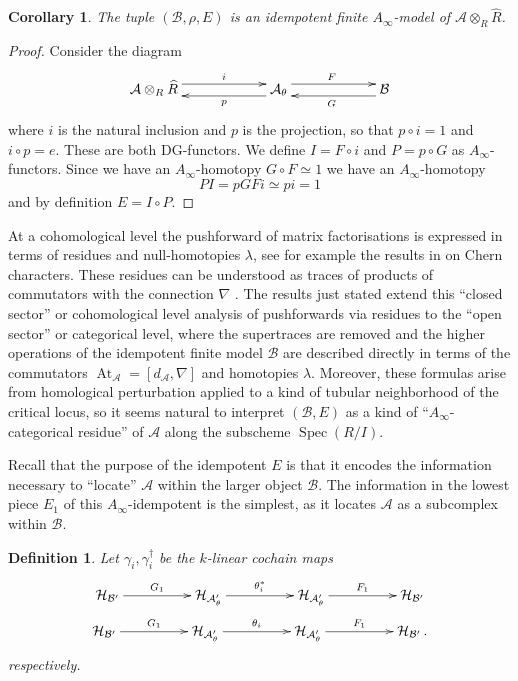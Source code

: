 \documentclass[english,letter paper,12pt,leqno]{article}
\newtheorem{corollary}[theorem]{Corollary}
\theoremstyle{example}
\newtheorem{definition}[theorem]{Definition}
\numberwithin{equation}{section}
\def\AA{\mathcal{A}}
\def\BB{\mathcal{B}}
\def\HH{\HH}
\def\HH{\mathcal{H}}
\DeclareMathOperator{\Spec}{Spec}
\DeclareMathOperator{\vAt}{At}
\begin{document}
\begin{corollary}\label{corollary:idempotent_finite_model} The tuple $(\BB, \rho, E)$ is an idempotent finite $A_\infty$-model of $\AA \otimes_R \widehat{R}$.
\end{corollary}
\begin{proof}
Consider the diagram
\[
\xymatrix@C+3pc{
\AA \otimes_R \widehat{R} \ar@<1ex>[r]^-{i} & \AA_\theta \ar@<1ex>[l]^-{p} \ar@<1ex>[r]^F & \BB \ar@<1ex>[l]^G
}
\]
where $i$ is the natural inclusion and $p$ is the projection, so that $p \circ i = 1$ and $i \circ p = e$. These are both DG-functors. We define $I = F \circ i$ and $P = p \circ G$ as $A_\infty$-functors. Since we have an $A_\infty$-homotopy $G \circ F \simeq 1$ we have an $A_\infty$-homotopy
\[
P I = p G F i \simeq p i = 1
\]
and by definition $E = I \circ P$.
\end{proof}

At a cohomological level the pushforward of matrix factorisations is expressed in terms of residues and null-homotopies $\lambda$, see for example the results in \cite[\S 11.2]{pushforward} on Chern characters. These residues can be understood as traces of products of commutators with the connection $\nabla$ \cite[Proposition B.4]{pushforward}. The results just stated extend this ``closed sector'' or cohomological level analysis of pushforwards via residues to the ``open sector'' or categorical level, where the supertraces are removed and the higher operations of the idempotent finite model $\BB$ are described directly in terms of the commutators $\vAt_{\AA} = [d_{\AA}, \nabla]$ and homotopies $\lambda$. Moreover, these formulas arise from homological perturbation applied to a kind of tubular neighborhood of the critical locus, so it seems natural to interpret $(\BB, E)$ as a kind of ``$A_\infty$-categorical residue'' of $\AA$ along the subscheme $\Spec(R/I)$.
\vspace{0.2cm}

Recall that the purpose of the idempotent $E$ is that it encodes the information necessary to ``locate'' $\AA$ within the larger object $\BB$. The information in the lowest piece $E_1$ of this $A_\infty$-idempotent is the simplest, as it locates $\AA$ as a subcomplex within $\BB$. 

\begin{definition}\label{defn:gamma_anddagger} Let $\gamma_i, \gamma_i^\dagger$ be the $k$-linear cochain maps
\begin{gather*}
\xymatrix@C+2pc{
\HH_{\BB'} \ar[r]^-{G_1} & \HH_{\AA'_{\theta}} \ar[r]^-{\theta_i^*} & \HH_{\AA'_{\theta}} \ar[r]^-{F_1} & \HH_{\BB'}
}\\
\xymatrix@C+2pc{
\HH_{\BB'} \ar[r]^-{G_1} & \HH_{\AA'_{\theta}} \ar[r]^-{\theta_i} & \HH_{\AA'_{\theta}} \ar[r]^-{F_1} & \HH_{\BB'}\,.
}
\end{gather*}
respectively.
\end{definition}
\end{document}
